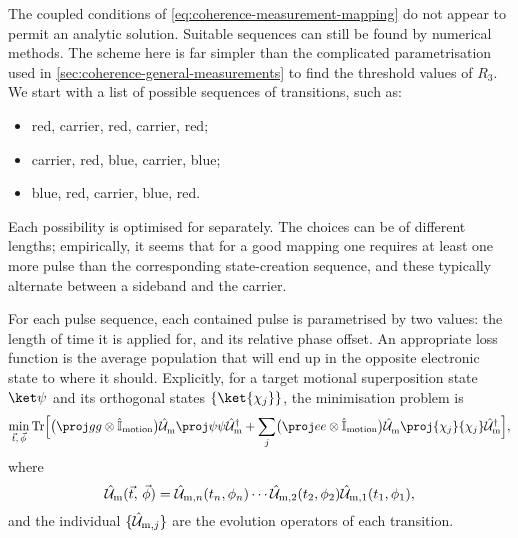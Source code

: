 The coupled conditions of \cref{eq:coherence-measurement-mapping} do not appear to permit an analytic solution.
Suitable sequences can still be found by numerical methods.
The scheme here is far simpler than the complicated parametrisation used in \cref{sec:coherence-general-measurements} to find the threshold values of $R_3$.
We start with a list of possible sequences of transitions, such as:
\begin{itemize}[topsep=0.2\baselineskip,itemsep=0pt]
\item \textcolor{redsb}{red}, \textcolor{carrier}{carrier}, \textcolor{redsb}{red}, \textcolor{carrier}{carrier}, \textcolor{redsb}{red};
\item \textcolor{carrier}{carrier}, \textcolor{redsb}{red}, \textcolor{bluesb}{blue}, \textcolor{carrier}{carrier}, \textcolor{bluesb}{blue};
\item \textcolor{bluesb}{blue}, \textcolor{redsb}{red}, \textcolor{carrier}{carrier}, \textcolor{bluesb}{blue}, \textcolor{redsb}{red}.
\end{itemize}
Each possibility is optimised for separately.
The choices can be of different lengths; empirically, it seems that for a good mapping one requires at least one more pulse than the corresponding state-creation sequence, and these typically alternate between a sideband and the carrier.

For each pulse sequence, each contained pulse is parametrised by two values: the length of time it is applied for, and its relative phase offset.
An appropriate loss function is the average population that will end up in the opposite electronic state to where it should.
Explicitly, for a target motional superposition state $\ket\psi$ and its orthogonal states $\{\ket{\chi_j}\}$, the minimisation problem is
\begin{equation}\label{eq:coherence-mapping-loss}
\min_{\vec t,\,\vec\phi} \Tr\Bigl[ \bigl(\proj gg\otimes\I_{\text{motion}}\bigr) \U_{\text m}^{}\proj\psi\psi\U_{\text m}^{\smash\dagger} + \sum_j\bigl(\proj ee\otimes\I_{\text{motion}}\bigr) \U_{\text m}^{}\proj{\chi_j}{\chi_j}\U_{\text m}^{\smash\dagger}\Bigr],
\end{equation}
where
\begin{equation}\label{eq:coherence-mapping-subsequence}
\hat{\mathcal U}_{\text m}(\vec t,\,\vec\phi) = \hat{\mathcal U}_{\text m,n}(t_n,\phi_n)\dotsm\hat{\mathcal U}_{\text m,2}(t_2,\phi_2)\hat{\mathcal U}_{\text m,1}(t_1,\phi_1),
\end{equation}
and the individual $\{\hat{\mathcal U}_{\text m,j}\}$ are the evolution operators of each transition.

